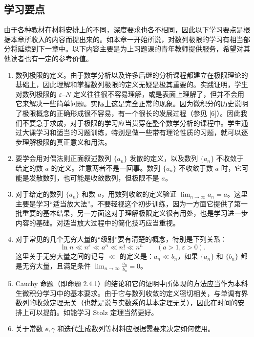 \subsection{学习要点}

由于各种教材在材料安排上的不同，深度要求也各不相同，因此以下学习要点是根据本章所收入的内容而提出来的。如本章一开始所说，对数列极限的学习有相当部分将延续到下一章中。以下内容主要是为上习题课的青年教师提供服务，希望对其他读者也有一定的参考价值。

\begin{enumerate}[label=\arabic*.]
  \item 数列极限的定义。由于数学分析以及许多后继的分析课程都建立在极限理论的基础上，因此理解和掌握数列极限的定义无疑是极其重要的。实践证明，学生对数列极限的 $\varepsilon$--$N$ 定义往往很不容易理解，或是表面上理解了，但并不会用它来解决一些简单问题。实际上这是完全正常的现象。因为微积分的历史说明了极限概念的正确形成很不容易，有一个很长的发展过程（参见 [6]）。因此我们不要急于求成，对于极限的学习应当贯穿在整个数学分析的课程中。学生通过大课学习和适当的习题训练，特别是做一些带有理论性质的习题，就可以逐步理解极限的真正意义和用法。
  \item 要学会用对偶法则正面叙述数列 $\{a_n\}$ 发散的定义，以及数列 $\{a_n\}$ 不收敛于给定的数 $a$ 的定义。注意两者不是一回事。数列 $\{a_n\}$ 不收敛于数 $a$ 时，它可能是发散数列，也可能是收敛数列，但极限不是 $a$。
  \item 对于给定的数列 $\{a_n\}$ 和数 $a$，用数列收敛的定义验证 $\displaystyle\lim_{n\to\infty}a_n=a$。这里主要是学习“适当放大法”。不要轻视这个初步训练，因为一方面它提供了第一批重要的基本结果，另一方面这对于理解极限定义很有用处，也是学习进一步内容的基础。对适当放大过程中的简化技巧应当重视。
  \item 对于常见的几个无穷大量的“级别”要有清楚的概念，特别是下列关系：
  \[
    \ln n\ll n^\varepsilon\ll a^n\ll n!\ll n^n
    \qquad(a>1,\varepsilon>0).
  \]
  这里关于无穷大量之间的记号 $\ll$ 的定义是：$a_n\ll b_n$，如果 $\{a_n\}$ 和 $\{b_n\}$ 都是无穷大量，且满足条件 $\displaystyle\lim_{n\to\infty}\frac{a_n}{b_n}=0$。
  \item Cauchy 命题（即命题 2.4.1）的结论和它的证明中所体现的方法应当作为本科生微积分学习中的基本要求。由于它与数列收敛的定义密切相关，与单调有界数列的收敛定理无关（也就是说与实数系的基本定理无关），因此在时间的安排上可以提前。如能学习 Stolz 定理当然更好。
  \item 关于常数 $\ee,\gamma$ 和迭代生成数列等材料应根据需要来决定如何使用。
\end{enumerate}

